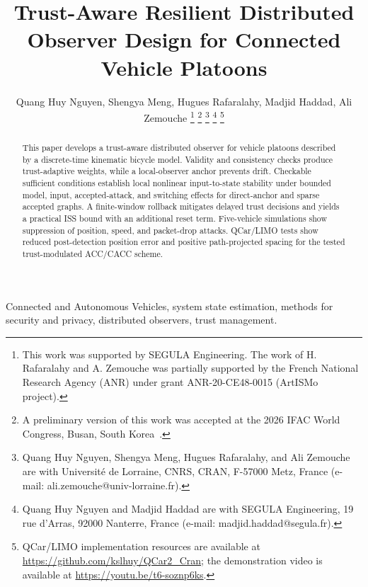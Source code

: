 \documentclass[letterpaper,journal]{IEEEtran}
\begin{document}
\title{Trust-Aware Resilient Distributed Observer Design for Connected Vehicle Platoons}
\author{Quang Huy Nguyen, Shengya Meng, Hugues Rafaralahy, Madjid Haddad, Ali Zemouche%
\thanks{This work was supported by SEGULA Engineering. The work of H. Rafaralahy and A. Zemouche was partially supported by the French National Research Agency (ANR) under grant ANR-20-CE48-0015 (ArtISMo project).}%
\thanks{A preliminary version of this work was accepted at the 2026 IFAC World Congress, Busan, South Korea~\cite{nguyen2026ifac}.}%
\thanks{Quang Huy Nguyen, Shengya Meng, Hugues Rafaralahy, and Ali Zemouche are with Universit\'e de Lorraine, CNRS, CRAN, F-57000 Metz, France (e-mail: ali.zemouche@univ-lorraine.fr).}%
\thanks{Quang Huy Nguyen and Madjid Haddad are with SEGULA Engineering, 19 rue d'Arras, 92000 Nanterre, France (e-mail: madjid.haddad@segula.fr).}%
\thanks{QCar/LIMO implementation resources are available at \protect\url{https://github.com/kslhuy/QCar2_Cran}; the demonstration video is available at \protect\url{https://youtu.be/t6-soznp6ks}.}}

\maketitle

\begin{abstract}
This paper develops a trust-aware distributed observer for vehicle platoons described by a discrete-time kinematic bicycle model. Validity and consistency checks produce trust-adaptive weights, while a local-observer anchor prevents drift. Checkable sufficient conditions establish local nonlinear input-to-state stability under bounded model, input, accepted-attack, and switching effects for direct-anchor and sparse accepted graphs. A finite-window rollback mitigates delayed trust decisions and yields a practical ISS bound with an additional reset term. Five-vehicle simulations show suppression of position, speed, and packet-drop attacks. QCar/LIMO tests show reduced post-detection position error and positive path-projected spacing for the tested trust-modulated ACC/CACC scheme.
\end{abstract}

\begin{IEEEkeywords}
Connected and Autonomous Vehicles, system state estimation, methods for security and privacy, distributed observers, trust management.
\end{IEEEkeywords}
\end{document}
